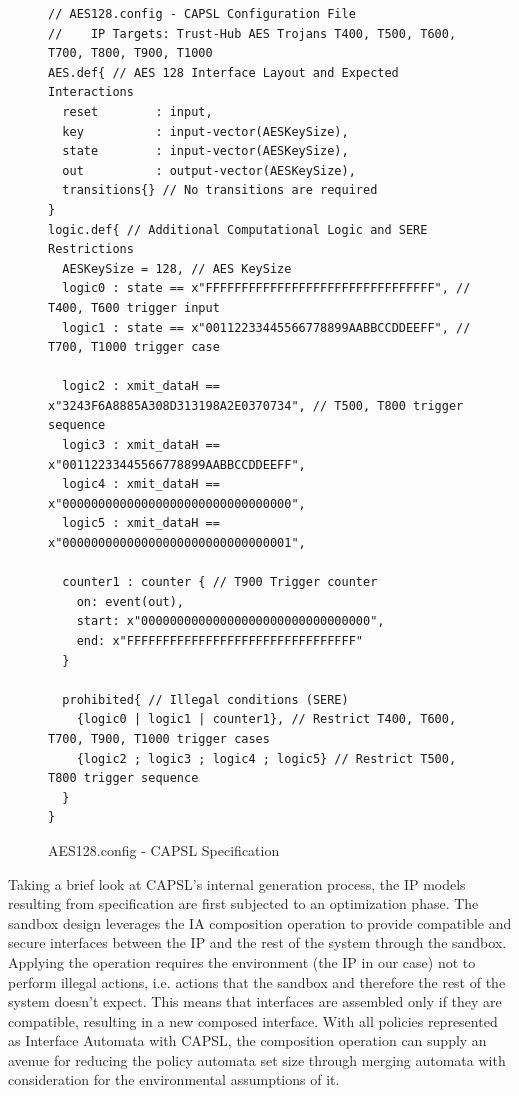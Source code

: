 \documentclass[sigconf]{acmart}
\theoremstyle{plain}
\theoremstyle{remark}
\begin{document}
\begin{figure} [t]
\begin{lstlisting}
// AES128.config - CAPSL Configuration File
//    IP Targets: Trust-Hub AES Trojans T400, T500, T600, T700, T800, T900, T1000
AES.def{ // AES 128 Interface Layout and Expected Interactions
  reset        : input,
  key          : input-vector(AESKeySize),
  state        : input-vector(AESKeySize),
  out          : output-vector(AESKeySize),
  transitions{} // No transitions are required
}
logic.def{ // Additional Computational Logic and SERE Restrictions
  AESKeySize = 128, // AES KeySize
  logic0 : state == x"FFFFFFFFFFFFFFFFFFFFFFFFFFFFFFFF", // T400, T600 trigger input
  logic1 : state == x"00112233445566778899AABBCCDDEEFF", // T700, T1000 trigger case

  logic2 : xmit_dataH == x"3243F6A8885A308D313198A2E0370734", // T500, T800 trigger sequence
  logic3 : xmit_dataH == x"00112233445566778899AABBCCDDEEFF",
  logic4 : xmit_dataH == x"00000000000000000000000000000000",
  logic5 : xmit_dataH == x"00000000000000000000000000000001",

  counter1 : counter { // T900 Trigger counter
    on: event(out),
    start: x"00000000000000000000000000000000",
    end: x"FFFFFFFFFFFFFFFFFFFFFFFFFFFFFFFF"
  }

  prohibited{ // Illegal conditions (SERE)
    {logic0 | logic1 | counter1}, // Restrict T400, T600, T700, T900, T1000 trigger cases
    {logic2 ; logic3 ; logic4 ; logic5} // Restrict T500, T800 trigger sequence
  }
}
\end{lstlisting}
\vspace*{-0.2cm}
\caption{AES128.config - CAPSL Specification}
\label{fig:AES128Spec}
\vspace*{-0.3cm}
\end{figure}

Taking a brief look at CAPSL's internal generation process, the IP models resulting from specification are first subjected to an optimization phase. The sandbox design leverages the IA composition operation to provide compatible and secure interfaces between the IP and the rest of the system through the sandbox. Applying the operation requires the environment (the IP in our case) not to perform illegal actions, i.e. actions that the sandbox and therefore the rest of the system doesn't expect. This means that interfaces are assembled only if they are compatible, resulting in a new composed interface. With all policies represented as Interface Automata with CAPSL, the composition operation can supply an avenue for reducing the policy automata set size through merging automata with consideration for the environmental assumptions of it.
\end{document}
